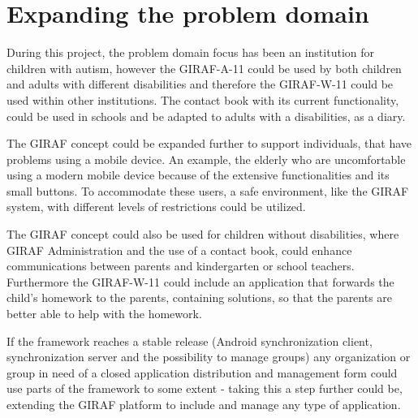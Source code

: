 \section{Expanding the problem domain}
During this project, the problem domain focus has been an institution for children with autism, however the GIRAF-A-11 could be used by both children and adults with different disabilities and therefore the GIRAF-W-11 could be used within other institutions. The contact book with its current functionality, could be used in schools and be adapted to adults with a disabilities, as a diary.     

The GIRAF concept could be expanded further to support individuals, that have problems using a mobile device. An example, the elderly who are uncomfortable using a modern mobile device because of the extensive functionalities and its small buttons. To accommodate these users, a safe environment, like the GIRAF system, with different levels of restrictions could be utilized.

The GIRAF concept could also be used for children without disabilities, where GIRAF Administration and the use of a contact book, could enhance communications between parents and kindergarten or school teachers. Furthermore the GIRAF-W-11 could include an application that forwards the child's homework to the parents, containing solutions, so that the parents are better able to help with the homework. 

If the framework reaches a stable release (Android synchronization client, synchronization server and the possibility to manage groups) any organization or group in need of a closed application distribution and management form could use parts of the framework to some extent - taking this a step further could be, extending the GIRAF platform to include and manage any type of application.